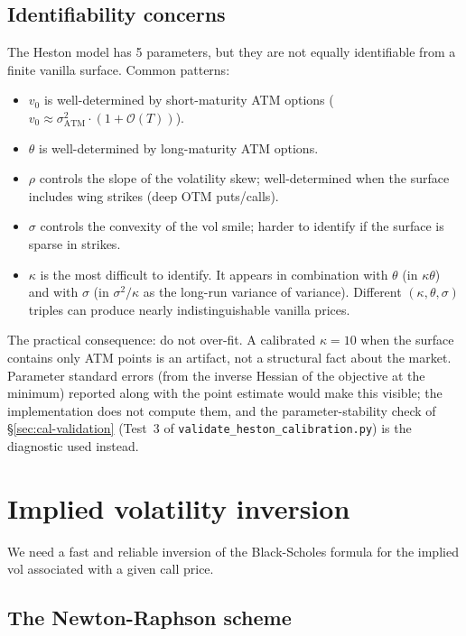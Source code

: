 \documentclass[11pt]{article}
\theoremstyle{plain}
\theoremstyle{definition}
\theoremstyle{remark}
\begin{document}
\subsection{Identifiability concerns}

The Heston model has 5 parameters, but they are not equally identifiable from a finite vanilla surface. Common patterns:
\begin{itemize}[topsep=2pt]
    \item $v_0$ is well-determined by short-maturity ATM options ($v_0 \approx \sigma_{\mathrm{ATM}}^2 \cdot (1 + \mathcal{O}(T))$).
    \item $\theta$ is well-determined by long-maturity ATM options.
    \item $\rho$ controls the slope of the volatility skew; well-determined when the surface includes wing strikes (deep OTM puts/calls).
    \item $\sigma$ controls the convexity of the vol smile; harder to identify if the surface is sparse in strikes.
    \item $\kappa$ is the most difficult to identify. It appears in combination with $\theta$ (in $\kappa\theta$) and with $\sigma$ (in $\sigma^2 / \kappa$ as the long-run variance of variance). Different $(\kappa, \theta, \sigma)$ triples can produce nearly indistinguishable vanilla prices.
\end{itemize}
The practical consequence: do not over-fit. A calibrated $\kappa = 10$ when the surface contains only ATM points is an artifact, not a structural fact about the market. Parameter standard errors (from the inverse Hessian of the objective at the minimum) reported along with the point estimate would make this visible; the implementation does not compute them, and the parameter-stability check of \S\ref{sec:cal-validation} (Test~3 of \texttt{validate\_heston\_calibration.py}) is the diagnostic used instead.

\section{Implied volatility inversion}

We need a fast and reliable inversion of the Black-Scholes formula for the implied vol associated with a given call price.

\subsection{The Newton-Raphson scheme}
\end{document}
